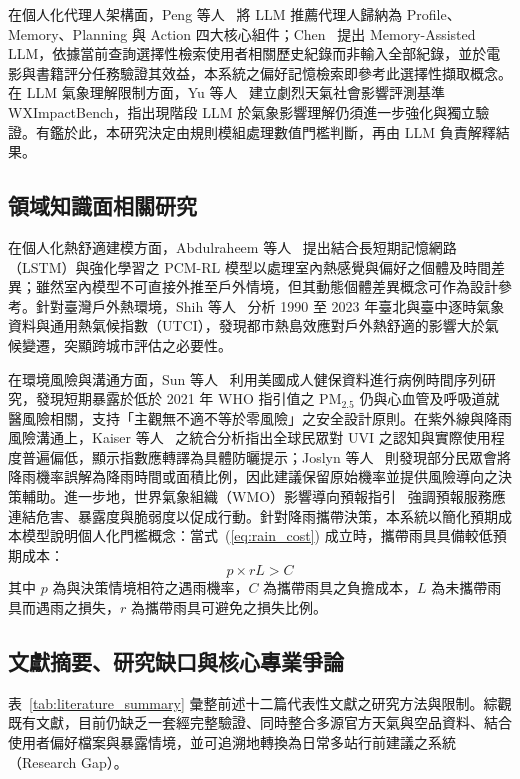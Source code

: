 \documentclass[conference]{IEEEtran}
\begin{document}
在個人化代理人架構面，Peng 等人~\cite{peng2025survey_rec_agents} 將 LLM 推薦代理人歸納為 Profile、Memory、Planning 與 Action 四大核心組件；Chen~\cite{chen2025memory_llm} 提出 Memory-Assisted LLM，依據當前查詢選擇性檢索使用者相關歷史紀錄而非輸入全部紀錄，並於電影與書籍評分任務驗證其效益，本系統之偏好記憶檢索即參考此選擇性擷取概念。在 LLM 氣象理解限制方面，Yu 等人~\cite{yu2025wximpactbench} 建立劇烈天氣社會影響評測基準 WXImpactBench，指出現階段 LLM 於氣象影響理解仍須進一步強化與獨立驗證。有鑑於此，本研究決定由規則模組處理數值門檻判斷，再由 LLM 負責解釋結果。

\subsection{領域知識面相關研究}
在個人化熱舒適建模方面，Abdulraheem 等人~\cite{abdulraheem2025pcm_rl} 提出結合長短期記憶網路（LSTM）與強化學習之 PCM-RL 模型以處理室內熱感覺與偏好之個體及時間差異；雖然室內模型不可直接外推至戶外情境，但其動態個體差異概念可作為設計參考。針對臺灣戶外熱環境，Shih 等人~\cite{shih2025taiwan_utci} 分析 1990 至 2023 年臺北與臺中逐時氣象資料與通用熱氣候指數（UTCI），發現都市熱島效應對戶外熱舒適的影響大於氣候變遷，突顯跨城市評估之必要性。

在環境風險與溝通方面，Sun 等人~\cite{sun2024low_pm25} 利用美國成人健保資料進行病例時間序列研究，發現短期暴露於低於 2021 年 WHO 指引值之 PM$_{2.5}$ 仍與心血管及呼吸道就醫風險相關，支持「主觀無不適不等於零風險」之安全設計原則。在紫外線與降雨風險溝通上，Kaiser 等人~\cite{kaiser2025uvi_review} 之統合分析指出全球民眾對 UVI 之認知與實際使用程度普遍偏低，顯示指數應轉譯為具體防曬提示；Joslyn 等人~\cite{joslyn2009pop} 則發現部分民眾會將降雨機率誤解為降雨時間或面積比例，因此建議保留原始機率並提供風險導向之決策輔助。進一步地，世界氣象組織（WMO）影響導向預報指引~\cite{wmo2015impact_forecast} 強調預報服務應連結危害、暴露度與脆弱度以促成行動。針對降雨攜帶決策，本系統以簡化預期成本模型說明個人化門檻概念：當式~(\ref{eq:rain_cost}) 成立時，攜帶雨具具備較低預期成本：
\begin{equation}
  p \times rL > C
  \label{eq:rain_cost}
\end{equation}
其中 $p$ 為與決策情境相符之遇雨機率，$C$ 為攜帶雨具之負擔成本，$L$ 為未攜帶雨具而遇雨之損失，$r$ 為攜帶雨具可避免之損失比例。

\subsection{文獻摘要、研究缺口與核心專業爭論}
表~\ref{tab:literature_summary} 彙整前述十二篇代表性文獻之研究方法與限制。綜觀既有文獻，目前仍缺乏一套經完整驗證、同時整合多源官方天氣與空品資料、結合使用者偏好檔案與暴露情境，並可追溯地轉換為日常多站行前建議之系統（Research Gap）。
\end{document}

